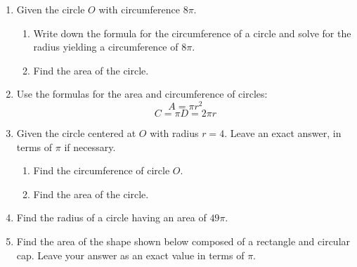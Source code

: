 \begin{enumerate}
\item Given the circle $O$ with circumference $8\pi$.
  \begin{enumerate}
    \item Write down the formula for the circumference of a circle and solve for the radius yielding a circumference of $8\pi$. \vspace{1cm}
    \item Find the area of the circle.
  \end{enumerate}

\item Use the formulas for the area and circumference of circles:
\[A=\pi r^2\]
\[C=\pi D = 2\pi r\]

\item Given the circle centered at $O$ with radius $r=4$. Leave an exact answer, in terms of $\pi$ if necessary.
\begin{multicols}{2}
  \begin{enumerate}
    \item Find the circumference of circle $O$. %
    \item Find the area of the circle.\vspace{2cm}
  \end{enumerate}
  \end{multicols}

\item Find the radius of a circle having an area of $49 \pi$. \vspace{2cm}

\item Find the area of the shape shown below composed of a rectangle and circular cap. Leave your answer as an exact value in terms of $\pi$.
  \begin{flushright}
\end{flushright}\vspace{1cm}



\end{enumerate}
